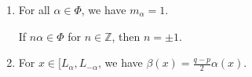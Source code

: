 \begin{enumerate}[label=(\alph*)]
	\item For all $\alpha \in \Phi$, we have $m_\alpha = 1$.

		If $n\alpha \in \Phi$ for $n \in \mathbb{Z}$, then $n = \pm 1$.
	\item For $x \in [L_\alpha, L_{-\alpha}$, we have
		$\beta(x) = \frac{q - p}{2}\alpha(x)$.
\end{enumerate}
